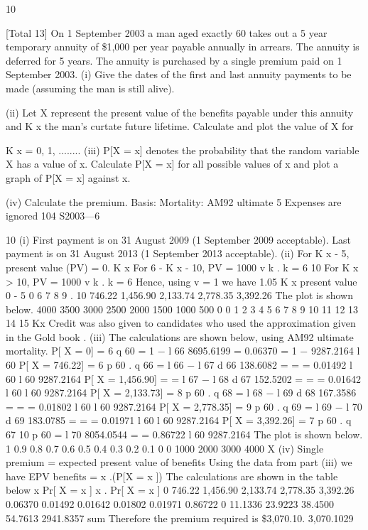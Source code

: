 \documentclass[a4paper,12pt]{article}
\begin{document}
10

[Total 13]
On 1 September 2003 a man aged exactly 60 takes out a 5 year temporary annuity of
\$1,000 per year payable annually in arrears. The annuity is deferred for 5 years. The
annuity is purchased by a single premium paid on 1 September 2003.
(i) Give the dates of the first and last annuity payments to be made (assuming the
man is still alive).

(ii) Let X represent the present value of the benefits payable under this annuity
and K x the man’s curtate future lifetime. Calculate and plot the value of X for

K x = 0, 1, ........
(iii) P[X = x] denotes the probability that the random variable X has a value of x.
Calculate P[X = x] for all possible values of x and plot a graph of P[X = x]
against x.

(iv)
Calculate the premium.
Basis: Mortality: AM92 ultimate
5%
Expenses are ignored
104 S2003—6

\newpage

10
(i)
First payment is on 31 August 2009 (1 September 2009 acceptable).
Last payment is on 31 August 2013 (1 September 2013 acceptable).
(ii)
For K x - 5, present value (PV) = 0.
K x
For 6 - K x - 10, PV = 1000 \sum  v k .
k = 6
10
For K x > 10, PV = 1000 \sum  v k .
k = 6
Hence, using v =
1
we have
1.05
K x present value
0 - 5 0
6
7
8
9
. 10 746.22
1,456.90
2,133.74
2,778.35
3,392.26
The plot is shown below.
4000
3500
3000
2500
2000
1500
1000
500
0
0 1 2 3 4 5 6 7 8 9 10 11 12 13 14 15
Kx
Credit was also given to candidates who used the approximation given in the Gold book .
(iii)
The calculations are shown below, using AM92 ultimate mortality.
P[ X = 0] = 6 q 60 = 1 −
l 66
8695.6199
= 0.06370
= 1 −
9287.2164
l 60
P[ X = 746.22] = 6 p 60 . q 66 = l 66 − l 67 d 66 138.6082
=
=
= 0.01492
l 60
l 60 9287.2164
P[ X = 1,456.90] = = l 67 − l 68 d 67 152.5202
=
=
= 0.01642
l 60
l 60 9287.2164
P[ X = 2,133.73] = 8 p 60 . q 68 = l 68 − l 69 d 68 167.3586
=
=
= 0.01802
l 60
l 60 9287.2164
P[ X = 2,778.35] = 9 p 60 . q 69 = l 69 − l 70 d 69 183.0785
=
=
= 0.01971
l 60
l 60 9287.2164
P[ X = 3,392.26] =
7 p 60 . q 67
10 p 60
=
l 70 8054.0544
=
= 0.86722
l 60 9287.2164
The plot is shown below.
1
0.9
0.8
0.7
0.6
0.5
0.4
0.3
0.2
0.1
0
0
1000
2000
3000
4000
X
(iv)
Single premium = expected present value of benefits
Using the data from part (iii) we have
EPV benefits =
\sum  x .(P[X = x ])
The calculations are shown in the table below
x Pr[ X = x ] x . Pr[ X = x ]
0
746.22
1,456.90
2,133.74
2,778.35
3,392.26 0.06370
0.01492
0.01642
0.01802
0.01971
0.86722 0
11.1336
23.9223
38.4500
54.7613
2941.8357
sum
Therefore the premium required is \$3,070.10.
3,070.1029%
\end{document}
